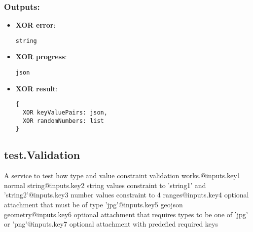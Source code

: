 \subsubsection*{Outputs:}
\begin{itemize}
    \item \textbf{XOR error}: 
\begin{lstlisting}
string
\end{lstlisting}
    \item \textbf{XOR progress}: 
\begin{lstlisting}
json
\end{lstlisting}
    \item \textbf{XOR result}: 
\begin{lstlisting}
{
  XOR keyValuePairs: json, 
  XOR randomNumbers: list
}
\end{lstlisting}
  \end{itemize}

\subsection{test.Validation}
\label{ch:builtinservices:test.Validation}
A
 service to test how type and value constraint validation 
works.@inputs.key1 normal string@inputs.key2 string values constraint to
 'string1' and 'string2'@inputs.key3 number values constraint to 4 
ranges@inputs.key4 optional attachment that must be of type 
'jpg'@inputs.key5 geojson geometry@inputs.key6 optional attachment that 
requires types to be one of 'jpg' or 'png'@inputs.key7 optional 
attachment with predefied required keys
